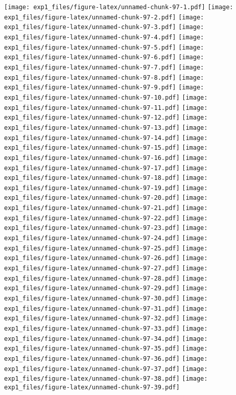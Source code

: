 \documentclass[,]{article}
\begin{document}
\newpage

\texttt{[image: exp1\_files/figure-latex/unnamed-chunk-97-1.pdf]}
\texttt{[image: exp1\_files/figure-latex/unnamed-chunk-97-2.pdf]}
\texttt{[image: exp1\_files/figure-latex/unnamed-chunk-97-3.pdf]}
\texttt{[image: exp1\_files/figure-latex/unnamed-chunk-97-4.pdf]}
\texttt{[image: exp1\_files/figure-latex/unnamed-chunk-97-5.pdf]}
\texttt{[image: exp1\_files/figure-latex/unnamed-chunk-97-6.pdf]}
\texttt{[image: exp1\_files/figure-latex/unnamed-chunk-97-7.pdf]}
\texttt{[image: exp1\_files/figure-latex/unnamed-chunk-97-8.pdf]}
\texttt{[image: exp1\_files/figure-latex/unnamed-chunk-97-9.pdf]}
\texttt{[image: exp1\_files/figure-latex/unnamed-chunk-97-10.pdf]}
\texttt{[image: exp1\_files/figure-latex/unnamed-chunk-97-11.pdf]}
\texttt{[image: exp1\_files/figure-latex/unnamed-chunk-97-12.pdf]}
\texttt{[image: exp1\_files/figure-latex/unnamed-chunk-97-13.pdf]}
\texttt{[image: exp1\_files/figure-latex/unnamed-chunk-97-14.pdf]}
\texttt{[image: exp1\_files/figure-latex/unnamed-chunk-97-15.pdf]}
\texttt{[image: exp1\_files/figure-latex/unnamed-chunk-97-16.pdf]}
\texttt{[image: exp1\_files/figure-latex/unnamed-chunk-97-17.pdf]}
\texttt{[image: exp1\_files/figure-latex/unnamed-chunk-97-18.pdf]}
\texttt{[image: exp1\_files/figure-latex/unnamed-chunk-97-19.pdf]}
\texttt{[image: exp1\_files/figure-latex/unnamed-chunk-97-20.pdf]}
\texttt{[image: exp1\_files/figure-latex/unnamed-chunk-97-21.pdf]}
\texttt{[image: exp1\_files/figure-latex/unnamed-chunk-97-22.pdf]}
\texttt{[image: exp1\_files/figure-latex/unnamed-chunk-97-23.pdf]}
\texttt{[image: exp1\_files/figure-latex/unnamed-chunk-97-24.pdf]}
\texttt{[image: exp1\_files/figure-latex/unnamed-chunk-97-25.pdf]}
\texttt{[image: exp1\_files/figure-latex/unnamed-chunk-97-26.pdf]}
\texttt{[image: exp1\_files/figure-latex/unnamed-chunk-97-27.pdf]}
\texttt{[image: exp1\_files/figure-latex/unnamed-chunk-97-28.pdf]}
\texttt{[image: exp1\_files/figure-latex/unnamed-chunk-97-29.pdf]}
\texttt{[image: exp1\_files/figure-latex/unnamed-chunk-97-30.pdf]}
\texttt{[image: exp1\_files/figure-latex/unnamed-chunk-97-31.pdf]}
\texttt{[image: exp1\_files/figure-latex/unnamed-chunk-97-32.pdf]}
\texttt{[image: exp1\_files/figure-latex/unnamed-chunk-97-33.pdf]}
\texttt{[image: exp1\_files/figure-latex/unnamed-chunk-97-34.pdf]}
\texttt{[image: exp1\_files/figure-latex/unnamed-chunk-97-35.pdf]}
\texttt{[image: exp1\_files/figure-latex/unnamed-chunk-97-36.pdf]}
\texttt{[image: exp1\_files/figure-latex/unnamed-chunk-97-37.pdf]}
\texttt{[image: exp1\_files/figure-latex/unnamed-chunk-97-38.pdf]}
\texttt{[image: exp1\_files/figure-latex/unnamed-chunk-97-39.pdf]}
\end{document}
